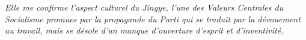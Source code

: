 \textit{Elle me confirme l'aspect culturel du \emph{Jingye}, l'une des Valeurs Centrales du Socialisme promues par la propagande du Parti qui se traduit par la dévouement au travail, mais se désole d'un manque d'ouverture d'esprit et d'inventivité.}






\stars












